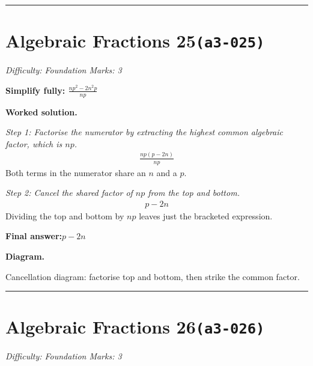 \documentclass[11pt]{article}
\newcommand{\question}[1]{\par\medskip\noindent\textbf{#1}\par}
\begin{document}
\medskip\hrule

\section*{Algebraic Fractions 25\quad\small\texttt{(a3-025)}}
\textit{Difficulty: Foundation \quad\textbar\quad Marks: 3}

\question{Simplify fully: \( \frac{np^2-2n^2p}{np} \)}

\textbf{Worked solution.}

\textit{Step 1: Factorise the numerator by extracting the highest common algebraic factor, which is \( np \).}
\[\begin{gathered}
\frac{np(p-2n)}{np}
\end{gathered}\]
Both terms in the numerator share an \( n \) and a \( p \).

\textit{Step 2: Cancel the shared factor of \( np \) from the top and bottom.}
\[\begin{gathered}
p-2n
\end{gathered}\]
Dividing the top and bottom by \( np \) leaves just the bracketed expression.

\begin{answerbox}
\textbf{Final answer:}\quad \(\displaystyle p-2n\)
\end{answerbox}
\textbf{Diagram.}

\begin{center}
\end{center}
\small Cancellation diagram: factorise top and bottom, then strike the common factor.\normalsize

\medskip\hrule

\section*{Algebraic Fractions 26\quad\small\texttt{(a3-026)}}
\textit{Difficulty: Foundation \quad\textbar\quad Marks: 3}
\end{document}
